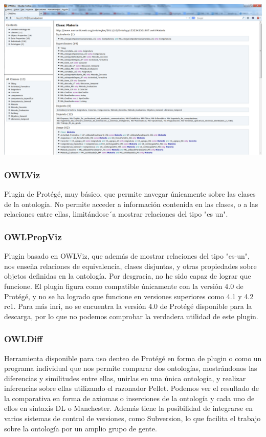 \begin{center}
		\includegraphics[width=1.00\textwidth]{Imagenes/Herramientas-OWLDoc.png}
\end{center}

\subsubsection{OWLViz} Plugin de Protégé, muy básico, que permite navegar únicamente sobre las clases de la ontología. No permite acceder a información contenida en las clases, o a las relaciones entre ellas, limitándose´a mostrar relaciones del tipo "es un". 

\subsubsection{OWLPropViz} Plugin basado en OWLViz, que además de mostrar relaciones del tipo "es-un", nos enseña relaciones de equivalencia, clases disjuntas, y otras propiedades sobre objetos definidas en la ontología. 
Por desgracia, no he sido capaz de lograr que funcione. El plugin figura como compatible únicamente con la versión 4.0 de Protégé, y no se ha logrado que funcione en versiones superiores como 4.1 y 4.2 rc1. Para más inri, no se encuentra la versión 4.0 de Protégé disponible para la descarga, por lo que no podemos comprobar la verdadera utilidad de este plugin.

\subsubsection{OWLDiff} Herramienta disponible para uso denteo de Protégé en forma de plugin o como un programa individual que nos permite comparar dos ontologías, mostrándonos las diferencias y similitudes entre ellas, unirlas en una única ontología, y realizar inferencias sobre ellas utilizando el razonador Pellet. Podemos ver el resultado de la comparativa en forma de axiomas o inserciones de la ontología y cada uno de ellos en sintaxis DL o Manchester.
Además tiene la posibilidad de integrarse en varios sistemas de control de versiones, como Subversion, lo que facilita el trabajo sobre la ontología por un amplio grupo de gente.

